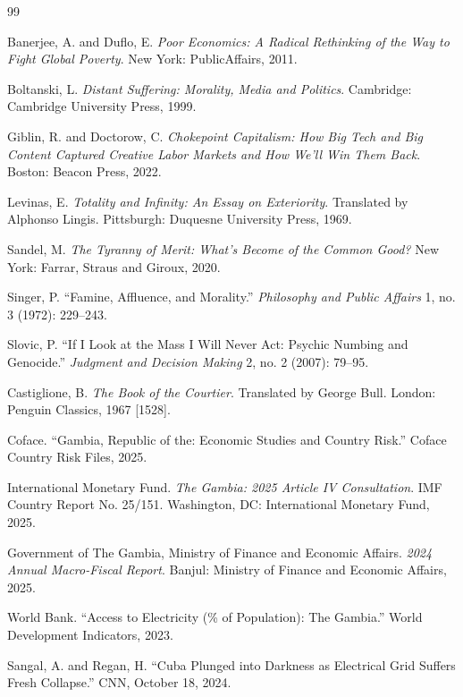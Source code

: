 \documentclass[11pt]{article}
\begin{document}
\begin{thebibliography}{99}

 Banerjee, A. and Duflo, E. \textit{Poor Economics: A Radical Rethinking of the Way to Fight Global Poverty}. New York: PublicAffairs, 2011.

 Boltanski, L. \textit{Distant Suffering: Morality, Media and Politics}. Cambridge: Cambridge University Press, 1999.

 Giblin, R. and Doctorow, C. \textit{Chokepoint Capitalism: How Big Tech and Big Content Captured Creative Labor Markets and How We'll Win Them Back}. Boston: Beacon Press, 2022.

 Levinas, E. \textit{Totality and Infinity: An Essay on Exteriority}. Translated by Alphonso Lingis. Pittsburgh: Duquesne University Press, 1969.

 Sandel, M. \textit{The Tyranny of Merit: What's Become of the Common Good?} New York: Farrar, Straus and Giroux, 2020.

 Singer, P. ``Famine, Affluence, and Morality.'' \textit{Philosophy and Public Affairs} 1, no. 3 (1972): 229--243.

 Slovic, P. ``If I Look at the Mass I Will Never Act: Psychic Numbing and Genocide.'' \textit{Judgment and Decision Making} 2, no. 2 (2007): 79--95.

 Castiglione, B. \textit{The Book of the Courtier}. Translated by George Bull. London: Penguin Classics, 1967 [1528].

 Coface. ``Gambia, Republic of the: Economic Studies and Country Risk.'' Coface Country Risk Files, 2025.

 International Monetary Fund. \textit{The Gambia: 2025 Article IV Consultation}. IMF Country Report No. 25/151. Washington, DC: International Monetary Fund, 2025.

 Government of The Gambia, Ministry of Finance and Economic Affairs. \textit{2024 Annual Macro-Fiscal Report}. Banjul: Ministry of Finance and Economic Affairs, 2025.

 World Bank. ``Access to Electricity (\% of Population): The Gambia.'' World Development Indicators, 2023.

 Sangal, A. and Regan, H. ``Cuba Plunged into Darkness as Electrical Grid Suffers Fresh Collapse.'' CNN, October 18, 2024.


\end{thebibliography}
\end{document}
